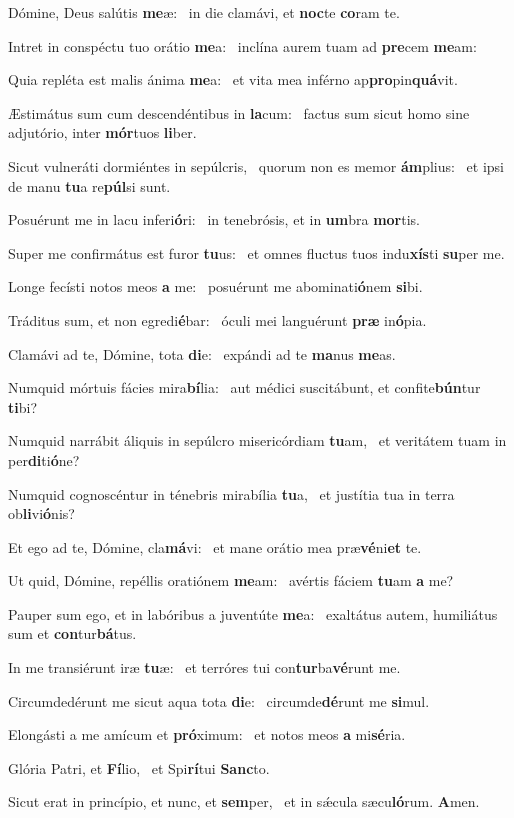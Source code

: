 \item Dómine, Deus salútis \textbf{me}æ:~\psstar{} in die clamávi, et \textbf{noc}te \textbf{co}ram te.
\item Intret in conspéctu tuo orátio \textbf{me}a:~\psstar{} inclína aurem tuam ad \textbf{pre}cem \textbf{me}am:
\item Quia repléta est malis ánima \textbf{me}a:~\psstar{} et vita mea inférno ap\textbf{pro}pin\textbf{quá}vit.
\item Æstimátus sum cum descendéntibus in \textbf{la}cum:~\psstar{} factus sum sicut homo sine adjutório, inter \textbf{mór}tuos \textbf{li}ber.
\item Sicut vulneráti dormiéntes in sepúlcris,~\pscross{} quorum non es memor \textbf{ám}plius:~\psstar{} et ipsi de manu \textbf{tu}a re\textbf{púl}si sunt.
\item Posuérunt me in lacu inferi\textbf{ó}ri:~\psstar{} in tenebrósis, et in \textbf{um}bra \textbf{mor}tis.
\item Super me confirmátus est furor \textbf{tu}us:~\psstar{} et omnes fluctus tuos indu\textbf{xís}ti \textbf{su}per me.
\item Longe fecísti notos meos \textbf{a} me:~\psstar{} posuérunt me abominati\textbf{ó}nem \textbf{si}bi.
\item Tráditus sum, et non egredi\textbf{é}bar:~\psstar{} óculi mei languérunt \textbf{præ} in\textbf{ó}pia.
\item Clamávi ad te, Dómine, tota \textbf{di}e:~\psstar{} expándi ad te \textbf{ma}nus \textbf{me}as.
\item Numquid mórtuis fácies mira\textbf{bí}lia:~\psstar{} aut médici suscitábunt, et confite\textbf{bún}tur \textbf{ti}bi?
\item Numquid narrábit áliquis in sepúlcro misericórdiam \textbf{tu}am,~\psstar{} et veritátem tuam in per\textbf{di}ti\textbf{ó}ne?
\item Numquid cognoscéntur in ténebris mirabília \textbf{tu}a,~\psstar{} et justítia tua in terra ob\textbf{li}vi\textbf{ó}nis?
\item Et ego ad te, Dómine, cla\textbf{má}vi:~\psstar{} et mane orátio mea præ\textbf{vé}ni\textbf{et} te.
\item Ut quid, Dómine, repéllis oratiónem \textbf{me}am:~\psstar{} avértis fáciem \textbf{tu}am \textbf{a} me?
\item Pauper sum ego, et in labóribus a juventúte \textbf{me}a:~\psstar{} exaltátus autem, humiliátus sum et \textbf{con}tur\textbf{bá}tus.
\item In me transiérunt iræ \textbf{tu}æ:~\psstar{} et terróres tui con\textbf{tur}ba\textbf{vé}runt me.
\item Circumdedérunt me sicut aqua tota \textbf{di}e:~\psstar{} circumde\textbf{dé}runt me \textbf{si}mul.
\item Elongásti a me amícum et \textbf{pró}ximum:~\psstar{} et notos meos \textbf{a} mi\textbf{sé}ria.
\item Glória Patri, et \textbf{Fí}lio,~\psstar{} et Spi\textbf{rí}tui \textbf{Sanc}to.
\item Sicut erat in princípio, et nunc, et \textbf{sem}per,~\psstar{} et in sǽcula sæcu\textbf{ló}rum. \textbf{A}men.

